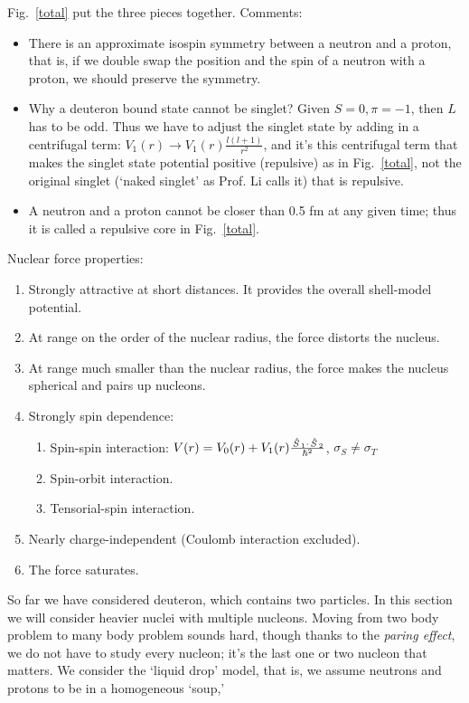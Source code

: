 \documentclass{school-22.101-notes}
\begin{document}
Fig.~\ref{total} put the three pieces together. Comments:
\begin{itemize}
\item There is an approximate isospin symmetry between a neutron and a proton, that is, if we double swap the position and the spin of a neutron with a proton, we should preserve the symmetry. 

\item Why a deuteron bound state cannot be singlet? Given $S=0, \pi = -1$, then $L$ has to be odd. Thus we have to adjust the singlet state by adding in a centrifugal term: $V_1(r) \to V_1(r) \frac{l(l+1)}{r^2}$, and it's this centrifugal term that makes the singlet state potential positive (repulsive) as in Fig.~\ref{total}, not the original singlet (`naked singlet' as Prof. Li calls it) that is repulsive. 

\item A neutron and a proton cannot be closer than 0.5 fm at any given time; thus it is called a repulsive core in Fig.~\ref{total}. 
\end{itemize}



Nuclear force properties: 
\begin{enumerate}
\item Strongly attractive at short distances. It provides the overall shell-model potential.
\item At range on the order of the nuclear radius, the force distorts the nucleus. 
\item At range much smaller than the nuclear radius, the force makes the nucleus spherical and pairs up nucleons.
\item Strongly spin dependence:
    \begin{enumerate}
    \item Spin-spin interaction: $V(r) = V_0(r) + V_1 (r) \frac{\left. \hat{S} \right._1 \cdot \left. \hat{S} \right._2}{\hbar^2} $, $\sigma_S \neq \sigma_T$
    \item Spin-orbit interaction.
    \item Tensorial-spin interaction. 
    \end{enumerate}    
\item Nearly charge-independent (Coulomb interaction excluded).
\item The force saturates.
\end{enumerate}



So far we have considered deuteron, which contains two particles. In this section we will consider heavier nuclei with multiple nucleons. Moving from two body problem to many body problem sounds hard, though thanks to the \textit{paring effect}, we do not have to study every nucleon; it's the last one or two nucleon that matters. We consider the `liquid drop' model, that is, we assume neutrons and protons to be in a homogeneous `soup,' 
\end{document}
